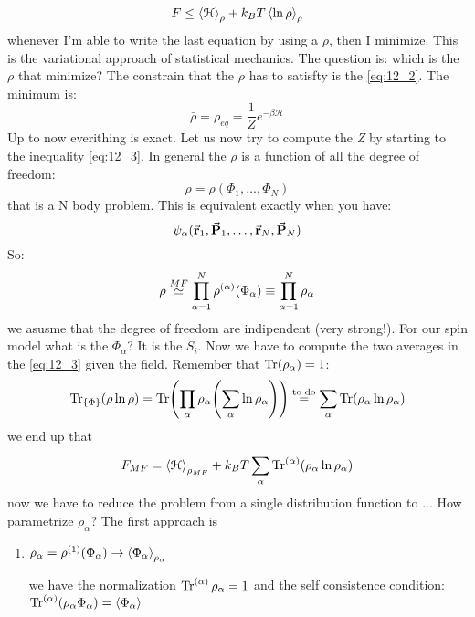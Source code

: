 \documentclass[../main/main.tex]{subfiles}
\begin{document}
\begin{equation}
  F \le \expval{\mathcal{H}}_\rho + k_B T \expval{\ln{\rho } }_\rho
  \label{eq:12_3}
\end{equation}
whenever I'm able to write the last equation by using a \( \rho  \), then I minimize. This is the variational approach of statistical mechanics. The question is: which is the \( \rho  \) that minimize?
The constrain that the \( \rho  \) has to satisfty is the \eqref{eq:12_2}.
The minimum is:
\begin{equation}
  \bar{\rho } = \rho _{eq} = \frac{1}{Z} e^{-\beta \mathcal{H}}
\end{equation}
Up to now everithing is exact. Let us now try to compute the \emph{Z} by starting to the inequality \eqref{eq:12_3}.
In general the \( \rho  \) is a function of all the degree of freedom:
\begin{equation}
  \rho = \rho (\Phi _1, \dots, \Phi _N)
\end{equation}
that is a N body problem. This is equivalent exactly when you have:
\begin{equation}
  \psi _ \alpha (\va{r}_1, \va{P}_1, \dots, \va{r}_N, \va{P}_N )
\end{equation}
So:
\begin{equation}
  \rho \overset{MF}{\simeq } \prod_{\alpha =1}^{N} \rho^{(\alpha )}\qty(\Phi _ \alpha ) \equiv \prod_{\alpha =1}^{N} \rho_ \alpha
\end{equation}
we asusme that the degree of freedom are indipendent (very strong!). For our spin model what is the \( \Phi _ \alpha  \)? It is the \( S_i \).
Now we have to compute the two averages in the \eqref{eq:12_3} given the field.
Remember that \( \Tr(\rho _ \alpha ) = 1  \):
\begin{equation}
  \Tr_{\{ \Phi  \}  } ( \rho \ln{\rho } ) = \Tr(\prod_{\alpha }^{} \rho _ \alpha  \qty( \sum_{\alpha }^{} \ln{\rho _ \alpha }  ) ) \overset{\text{to do}}{=} \sum_{\alpha }^{}
  \Tr(\rho _ \alpha  \ln{\rho _ \alpha } )
\end{equation}
we end up that
\begin{equation}
  F_{MF} = \expval{\mathcal{H}}_{\rho _{MF}} + k_B T \sum_{\alpha }^{} \Tr^{(\alpha )}(\rho _ \alpha  \ln{\rho _ \alpha } )
\end{equation}
now we have to reduce the problem from a single distribution function to ...
How parametrize \( \rho _ \alpha  \)?
The first approach is 
\begin{enumerate}
\item \( \rho _ \alpha = \rho ^{(1)} ( \Phi _{\alpha })  \rightarrow  \expval{\Phi _ \alpha }_ {\rho _ \alpha } \)

we have the normalization \( \Tr^{(\alpha )} \rho _ \alpha = 1  \) and the self consistence condition: \( \Tr^{(\alpha )}(\rho _ \alpha \Phi _ \alpha ) = \expval{\Phi _ \alpha }   \)

\end{enumerate}
\end{document}

